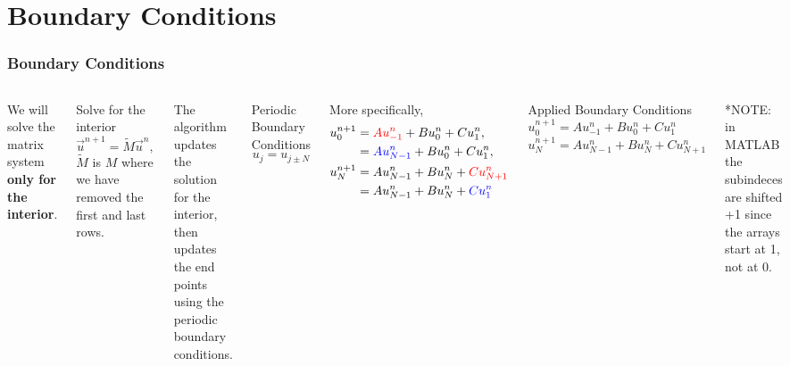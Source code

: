 \documentclass[compress]{beamer}
\begin{document}
\section{Boundary Conditions}
\begin{frame} \frametitle{Boundary Conditions}
\begin{columns}
We will solve the matrix system \textbf{only for the interior}.
\begin{block}{Solve for the interior}
$$\vec{u}^{n+1} = \tilde{M}\vec{u}^n,$$
$\tilde{M}$ is $M$ where we have removed the first and last rows.
\end{block}
The algorithm updates the solution for the interior, then updates the end points using the periodic boundary conditions.
\begin{block}{Periodic Boundary Conditions}
$$u_{j} = u_{j\pm N}$$
\end{block}
More specifically,
\begin{align*}
u^{n+1}_{0} &= \color{red}Au^n_{-1}\color{black} + Bu^n_{0} + Cu^n_{1},\\
 &= \color{blue}Au^n_{N-1}\color{black} + Bu^n_{0} + Cu^n_{1},\\
u^{n+1}_{N} &= Au^n_{N-1} + Bu^n_{N} + \color{red}Cu^n_{N+1}\\
 &= Au^n_{N-1} + Bu^n_{N} + \color{blue}Cu^n_{1}\\
\end{align*}
\vspace*{-1.2cm}
\begin{block}{Applied Boundary Conditions}
$u^{n+1}_{0} = Au^n_{-1} + Bu^n_{0} + Cu^n_{1}$
$u^{n+1}_{N} = Au^n_{N-1} + Bu^n_{N} + Cu^n_{N+1}$
\end{block}
*NOTE: in MATLAB the subindeces are shifted +1 since the arrays start at 1, not at 0.
\end{columns}
\end{frame}
\end{document}
